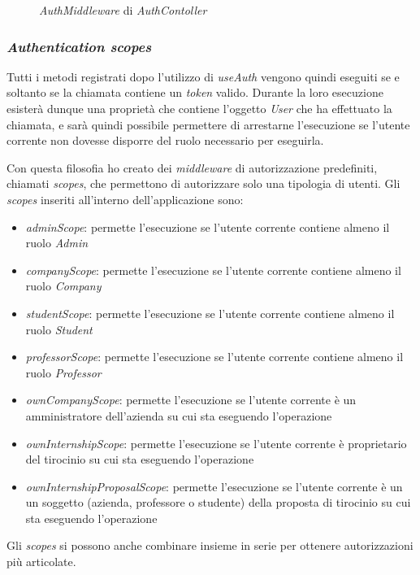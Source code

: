\begin{figure}[H] 
	\centering    
	
	\caption[\textit{AuthMiddleware} di \textit{AuthContoller}]{\textit{AuthMiddleware} di \textit{AuthContoller}}
	\label{fig:server-auth-middleware}
\end{figure}

\subsubsection{\textit{Authentication scopes}}
Tutti i metodi registrati dopo l'utilizzo di \textit{useAuth} vengono quindi eseguiti se e soltanto se la chiamata contiene un \textit{token} valido. Durante la loro esecuzione esisterà dunque una proprietà che contiene l'oggetto \textit{User} che ha effettuato la chiamata, e sarà quindi possibile permettere di arrestarne l'esecuzione se l'utente corrente non dovesse disporre del ruolo necessario per eseguirla.

Con questa filosofia ho creato dei \textit{middleware} di autorizzazione predefiniti, chiamati \textit{scopes}, che permettono di autorizzare solo una tipologia di utenti. Gli \textit{scopes} inseriti all'interno dell'applicazione sono:
\begin{itemize}[itemsep=0pt]
	\item \textit{adminScope}: permette l'esecuzione se l'utente corrente contiene almeno il ruolo \textit{Admin}
	\item \textit{companyScope}: permette l'esecuzione se l'utente corrente contiene almeno il ruolo \textit{Company}
	\item \textit{studentScope}: permette l'esecuzione se l'utente corrente contiene almeno il ruolo \textit{Student}
	\item \textit{professorScope}: permette l'esecuzione se l'utente corrente contiene almeno il ruolo \textit{Professor}
	\item \textit{ownCompanyScope}: permette l'esecuzione se l'utente corrente è un amministratore dell'azienda su cui sta eseguendo l'operazione
	\item \textit{ownInternshipScope}: permette l'esecuzione se l'utente corrente è proprietario del tirocinio su cui sta eseguendo l'operazione
	\item \textit{ownInternshipProposalScope}: permette l'esecuzione se l'utente corrente è un un soggetto (azienda, professore o studente) della proposta di tirocinio su cui sta eseguendo l'operazione
\end{itemize}
Gli \textit{scopes} si possono anche combinare insieme in serie per ottenere autorizzazioni più articolate.
